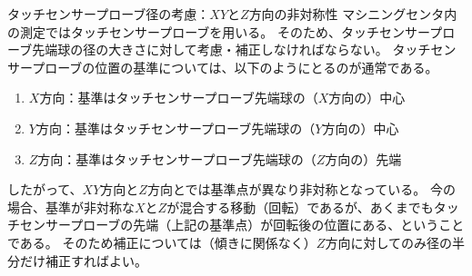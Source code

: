 \clearpage
\begin{\Columnname}{タッチセンサープローブ径の考慮：$XY$と$Z$方向の非対称性}
マシニングセンタ内の測定ではタッチセンサープローブを用いる。
そのため、タッチセンサープローブ先端球の径の大きさに対して考慮・補正しなければならない。
タッチセンサープローブの位置の基準については、以下のようにとるのが通常である。
\begin{enumerate}
\item $X$方向：基準はタッチセンサープローブ先端球の（$X$方向の）中心
\item $Y$方向：基準はタッチセンサープローブ先端球の（$Y$方向の）中心
\item $Z$方向：基準はタッチセンサープローブ先端球の（$Z$方向の）先端
\end{enumerate}
したがって、$XY$方向と$Z$方向とでは基準点が異なり非対称となっている。
今の場合、基準が非対称な$X$と$Z$が混合する移動（回転）であるが、あくまでもタッチセンサープローブの先端（上記の基準点）が回転後の位置にある、ということである。
そのため補正については（傾きに関係なく）$Z$方向に対してのみ径の半分だけ補正すればよい。
\end{\Columnname}


